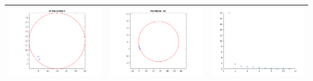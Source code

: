 \documentclass[10pt,a4paper,openright]{article}
\begin{document}
\begin{center}
\begin{tabular}{| l | l | l |}
    \includegraphics[scale=0.3]{conv2_init.png} & \includegraphics[scale=0.3]{conv2_end.png} & \includegraphics[scale=0.3]{conv2_history.png}\\ \hline
    \end{tabular}
\end{center}
\end{document}
